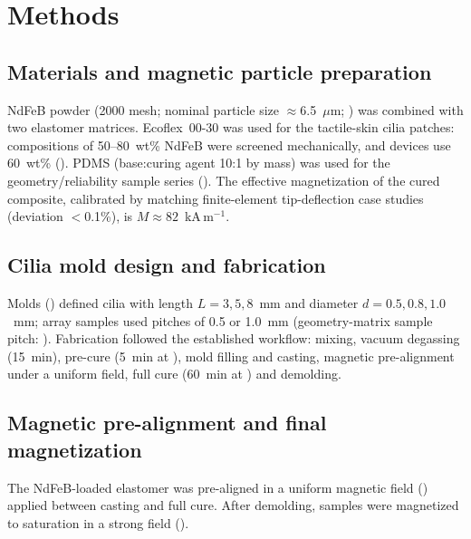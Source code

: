 \section*{Methods}

\subsection*{Materials and magnetic particle preparation}
NdFeB powder (2000 mesh; nominal particle size $\approx$6.5~$\mu$m;
) was combined with two elastomer matrices.
Ecoflex~00-30 was used for the tactile-skin cilia patches: compositions of
50--80~wt\% NdFeB were screened mechanically, and devices use 60~wt\%
(). PDMS
(base:curing agent 10:1 by mass) was used for the geometry/reliability sample
series (). The
effective magnetization of the cured composite, calibrated by matching
finite-element tip-deflection case studies (deviation $<$0.1\%), is
$M\approx82$~kA\,m$^{-1}$.

\subsection*{Cilia mold design and fabrication}
Molds () defined
cilia with length $L=3,5,8$~mm and diameter $d=0.5,0.8,1.0$~mm; array samples
used pitches of 0.5 or 1.0~mm (geometry-matrix sample pitch:
). Fabrication followed the established workflow:
mixing, vacuum degassing (15~min), pre-cure (5~min at
), mold filling and casting, magnetic pre-alignment
under a uniform field, full cure (60~min at ) and
demolding.

\subsection*{Magnetic pre-alignment and final magnetization}
The NdFeB-loaded elastomer was pre-aligned in a uniform magnetic field
() applied between casting and full
cure. After demolding, samples were magnetized to saturation in a strong
field ().

